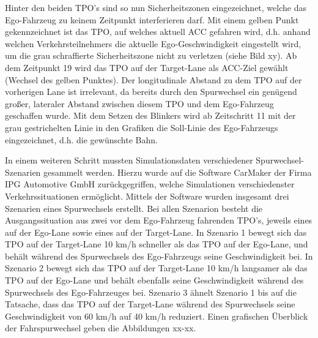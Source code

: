 Hinter den beiden TPO's sind so nun Sicherheitszonen eingezeichnet, welche das Ego-Fahrzeug zu keinem Zeitpunkt interferieren darf. Mit einem gelben Punkt gekennzeichnet ist das TPO, auf welches aktuell ACC gefahren wird, d.h. anhand welchen Verkehrsteilnehmers die aktuelle Ego-Geschwindigkeit eingestellt wird, um die grau schraffierte Sicherheitszone nicht zu verletzen (siehe Bild xy). Ab dem Zeitpunkt 19  wird das TPO auf der Target-Lane als ACC-Ziel gewählt (Wechsel des gelben Punktes). Der longitudinale Abstand zu dem TPO auf der vorherigen Lane ist irrelevant, da bereits durch den Spurwechsel ein genügend großer, lateraler Abstand zwischen diesem TPO und dem Ego-Fahrzeug geschaffen wurde. Mit dem Setzen des Blinkers wird ab Zeitschritt 11 mit der grau gestrichelten Linie in den Grafiken die Soll-Linie des Ego-Fahrzeugs eingezeichnet, d.h. die gewünschte Bahn.


In einem weiteren Schritt mussten Simulationsdaten verschiedener Spurwechsel-Szenarien gesammelt werden. Hierzu wurde auf die Software \glqq CarMaker\grqq{} der Firma IPG Automotive GmbH zurückgegriffen, welche Simulationen verschiedenster Verkehrssituationen ermöglicht. Mittels der Software wurden insgesamt drei Szenarien eines Spurwechsels erstellt. Bei allen Szenarion besteht die Ausgangssituation aus zwei vor dem Ego-Fahrzeug fahrenden TPO's, jeweils eines auf der Ego-Lane sowie eines auf der Target-Lane. In \glqq Szenario 1\grqq{} bewegt sich das TPO auf der Target-Lane 10 km/h schneller als das TPO auf der Ego-Lane, und behält während des Spurwechsels des Ego-Fahrzeugs seine Geschwindigkeit bei. In \glqq Szenario 2\grqq{} bewegt sich das TPO auf der Target-Lane 10 km/h langsamer als das TPO auf der Ego-Lane und behält ebenfalls seine Geschwindigkeit während des Spurwechsels des Ego-Fahrzeuges bei. \glqq Szenario 3\grqq{} ähnelt \glqq Szenario 1\grqq{} bis auf die Tatsache, dass das TPO auf der Target-Lane während des Spurwechsels seine Geschwindigkeit von 60 km/h auf 40 km/h reduziert. Einen grafischen Überblick der Fahrspurwechsel geben die Abbildungen xx-xx.


